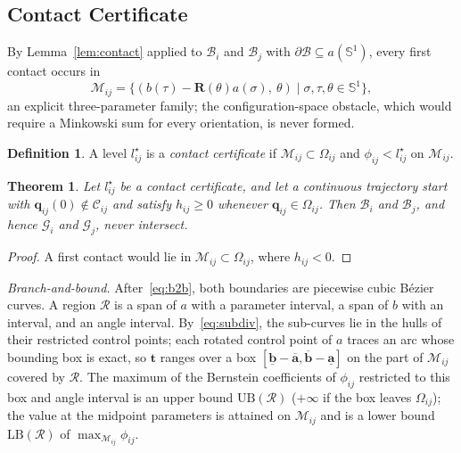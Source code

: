 \documentclass[journal]{IEEEtran}
\newtheorem{theorem}{Theorem}
\theoremstyle{definition}
\newtheorem{definition}{Definition}
\newcommand{\Sone}{\mathbb{S}^1}
\newcommand{\CO}{\mathcal{C}}
\newcommand{\Mset}{\mathcal{M}}
\newcommand{\Rot}{\mathbf{R}}
\begin{document}
\subsection{Contact Certificate}\label{sec:tab-cert}
By Lemma~\ref{lem:contact} applied to $\mathcal B_i$ and $\mathcal B_j$ with
$\partial\mathcal B\subseteq a(\Sone)$, every first contact occurs in
\begin{equation}\label{eq:M}
\Mset_{ij}=\{(b(\tau)-\Rot(\theta)a(\sigma),\ \theta)\mid \sigma,\tau,\theta\in\Sone\},
\end{equation}
an explicit three-parameter family; the configuration-space obstacle, which would require a
Minkowski sum for every orientation, is never formed.
\begin{definition}\label{def:cert}
A level $l^\star_{ij}$ is a \emph{contact certificate} if $\Mset_{ij}\subset\Omega_{ij}$ and
$\phi_{ij}<l^\star_{ij}$ on $\Mset_{ij}$.
\end{definition}
\begin{theorem}\label{thm:safe}
Let $l^\star_{ij}$ be a contact certificate, and let a continuous trajectory start with
$\mathbf q_{ij}(0)\notin\CO_{ij}$ and satisfy $h_{ij}\ge0$ whenever $\mathbf q_{ij}\in\Omega_{ij}$.
Then $\mathcal B_i$ and $\mathcal B_j$, and hence $\mathcal G_i$ and $\mathcal G_j$, never intersect.
\end{theorem}
\begin{proof}
A first contact would lie in $\Mset_{ij}\subset\Omega_{ij}$, where $h_{ij}<0$.
\end{proof}

\emph{Branch-and-bound.} After~\eqref{eq:b2b}, both boundaries are piecewise cubic B\'ezier curves. A
region $\mathcal R$ is a span of $a$ with a parameter interval, a span of $b$ with an interval, and an
angle interval. By~\eqref{eq:subdiv}, the sub-curves lie in the hulls of their restricted control
points; each rotated control point of $a$ traces an arc whose bounding box is exact, so $\mathbf t$
ranges over a box $[\underline{\mathbf b}-\overline{\mathbf a},\overline{\mathbf b}-\underline{\mathbf
a}]$ on the part of $\Mset_{ij}$ covered by $\mathcal R$. The maximum of the Bernstein coefficients of
$\phi_{ij}$ restricted to this box and angle interval is an upper bound $\mathrm{UB}(\mathcal R)$
($+\infty$ if the box leaves $\Omega_{ij}$); the value at the midpoint parameters is attained on
$\Mset_{ij}$ and is a lower bound $\mathrm{LB}(\mathcal R)$ of $\max_{\Mset_{ij}}\phi_{ij}$.
\end{document}
